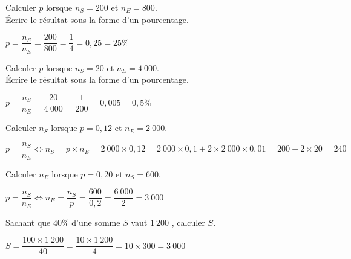 \documentclass[11pt,a4paper]{article}  %
\begin{document}
\vspace*{-0.4cm}
\begin{enumMet}
	\item Calculer $p$ lorsque $n_S = 200$ et $n_E = 800$.\\
	Écrire le résultat sous la forme d'un pourcentage.
	\begin{corrBox}
		$p=\dfrac{n_S}{n_E}=\dfrac{200}{800}=\dfrac{1}{4}=0,25=25\%$		
	\end{corrBox}
	\item {} Calculer $p$ lorsque $n_S = 20$ et $n_E= 4\ 000$.\\
	Écrire le résultat sous la forme d'un pourcentage.
	\begin{corrBox}
		$p=\dfrac{n_S}{n_E}=\dfrac{20}{4\ 000}=\dfrac{1}{200}=0,005=0,5\%$		
	\end{corrBox}
	\item Calculer $n_S$ lorsque $p = 0,12$ et $n_E= 2\ 000$.
	\begin{corrBox}
		$p=\dfrac{n_S}{n_E} \iff n_S=p\times n_E=2\ 000\times 0,12=2\ 000\times 0,1+2\times 2\ 000\times 0,01=200+2\times 20=240$		
	\end{corrBox}
	\item Calculer $n_E$ lorsque $p = 0,20$ et $n_S = 600$.
	\begin{corrBox}
		$p=\dfrac{n_S}{n_E} \iff n_E=\dfrac{n_S}{p}=\dfrac{600}{0,2}=\dfrac{6\ 000}{2}=3\ 000$		
	\end{corrBox}
	\item Sachant que $40 \%$ d'une somme $S$ vaut $1\ 200$ \EUR{}, calculer $S$.
	\begin{corrBox}
		$S=\dfrac{100\times 1\ 200}{40}=\dfrac{10\times 1\ 200}{4}=10\times 300=3\ 000$		
	\end{corrBox}
\end{enumMet}
\end{document}
